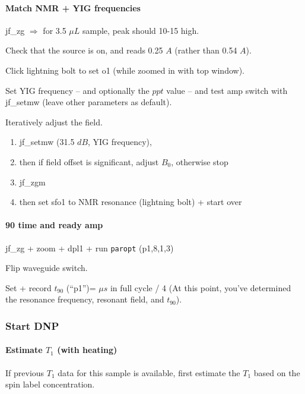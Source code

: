 \paragraph{ Match NMR + YIG frequencies}
jf\_zg $\Rightarrow$ for 3.5 $\mu L$ sample, peak should 10-15 high.

Check that the source is on, and reads 0.25 $A$ (rather than 0.54 $A$).

Click lightning bolt to set o1 (while zoomed in with top window).

Set YIG frequency -- and optionally the $ppt$ value -- and test amp switch with jf\_setmw (leave other parameters as default).

Iteratively adjust the field.
{\small
\begin{enumerate}
	\item jf\_setmw (31.5 $dB$, YIG frequency),
	\item then if field offset is significant, adjust $B_0$, otherwise stop
	\item jf\_zgm
	\item then set sfo1 to NMR resonance (lightning bolt) + start over
\end{enumerate}
}

\paragraph{90 time and ready amp}
jf\_zg + zoom + dpl1 + run {\tt paropt} (p1,8,1,3)

Flip waveguide switch.

Set + record $t_{90}$ (``p1'')= $\mu s$ in full cycle / 4 (At this point, you've determined the resonance frequency, resonant field, and $t_{90}$).

\subsubsection{Start DNP}
\paragraph{Estimate $T_1$ (with heating)}
If previous $T_1$ data for this sample is available, first estimate the $T_1$ based on the spin label concentration.

